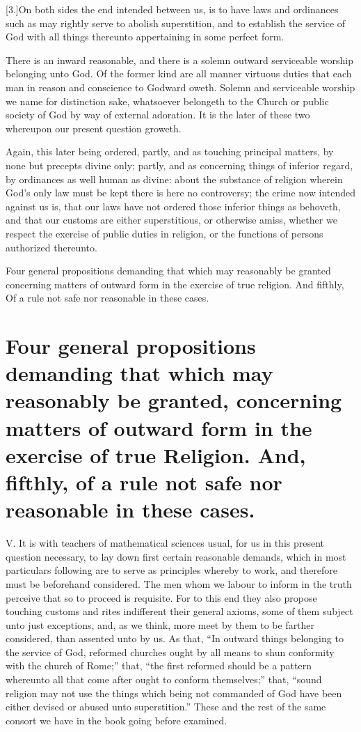 [3.]On both sides the end intended between us, is to have laws and ordinances such as may rightly serve to abolish superstition, and to establish the service of God with all things thereunto appertaining in some perfect form.

There is an inward reasonable, and there is a solemn outward serviceable worship belonging unto God. Of the former kind are all manner virtuous duties that each man in reason and conscience to Godward oweth. Solemn and serviceable worship we name for distinction sake, whatsoever belongeth to the Church or public society of God by way of external adoration. It is the later of these two whereupon our present question groweth.

Again, this later being ordered, partly, and as touching principal matters, by none but precepts divine only; partly, and as concerning things of inferior regard, by ordinances as well human as divine: about the substance of religion wherein God’s only law must be kept there is here no controversy; the crime now intended against us is, that our laws have not ordered those inferior things as behoveth, and that our customs are either superstitious, or otherwise amiss, whether we respect the exercise of public duties in religion, or the functions of persons authorized thereunto.


Four general propositions demanding that which may reasonably be granted concerning matters of outward form in the exercise of true religion. And fifthly, Of a rule not safe nor reasonable in these cases.
\section*{Four general propositions demanding that which may reasonably be granted, concerning matters of outward form in the exercise of true Religion. And, fifthly, of a rule not safe nor reasonable in these cases.}
V. It is with teachers of mathematical sciences usual, for us in this present question necessary, to lay down first certain reasonable demands, which in most particulars following are to serve as principles whereby to work, and therefore must be beforehand considered. The men whom we labour to  inform in the truth perceive that so to proceed is requisite. For to this end they also propose touching customs and rites indifferent their general axioms, some of them subject unto just exceptions, and, as we think, more meet by them to be farther considered, than assented unto by us. As that, “In outward things belonging to the service of God, reformed churches ought by all means to shun conformity with the church of Rome;” that, “the first reformed should be a pattern whereunto all that come after ought to conform themselves;” that, “sound religion may not use the things which being not commanded of God have been either devised or abused unto superstition.” These and the rest of the same consort we have in the book going before examined.

